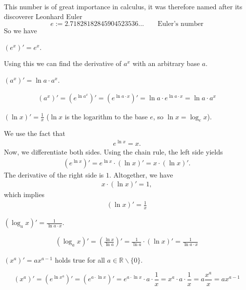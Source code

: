 \documentclass[12pt,eng]{skript_ogg}
\begin{document}
This number is of great importance in calculus, it was therefore named after its discoverer Leonhard Euler
\[e:=2.71828182845904523536\ldots\qquad\mbox{Euler's number}\]
So we have
\begin{satz}$\left( e^{x}\right)'=e^{x}$.
\end{satz}
Using this we can find the derivative of $a^x$ with an arbitrary base $a$.
\begin{satz}$(a^x)'=\ln a\cdot a^x$.
\end{satz}
\begin{beweis}
\begin{align*}
\left(a^x\right)'=\left(e^{\ln a^x}\right)'=\left(e^{\ln a\cdot x}\right)'=\ln a \cdot e^{\ln a\cdot x}=\ln a \cdot a^x
\end{align*}
\end{beweis}

\newpage

\begin{satz}
$(\ln x)'=\frac{1}{x}$ ($\ln x$ is the logarithm to the base $e$, so $\ln x=\log_ex$). 
\end{satz}
\begin{beweis}
We use the fact that
\begin{align*}
e^{\ln x}=x.
\end{align*}
Now, we differentiate both sides. Using the chain rule, the left side yields
\begin{align*}
\left(e^{\ln x} \right)'=e^{\ln x}\cdot \left(\ln x\right)'=x\cdot(\ln x)'.
\end{align*}
The derivative of the right side is $1$. Altogether, we have
\begin{align*}
x\cdot (\ln x)'=1,
\end{align*}
which implies
\begin{align*}
(\ln x)'=\frac{1}{x}
\end{align*}
\end{beweis}

\begin{satz}
$(\log_a x)'=\frac{1}{\ln a\cdot x}$.
\end{satz}

\begin{beweis}
\begin{align*}
(\log_a x)'=\left(\frac{\ln x}{\ln a}\right)'=\frac{1}{\ln a}\cdot (\ln
x)'=\frac{1}{\ln a\cdot x}
\end{align*}
\end{beweis}

\begin{satz}$(x^a)'=ax^{a-1}$ holds true for all $a\in\mathbb{R}\backslash\{0\}$.
\end{satz}
\begin{beweis}
\[(x^a)'=\left(e^{\ln x^a}\right)'=\left(e^{a\cdot\ln x}\right)'=e^{a\cdot\ln x}\cdot a\cdot\frac{1}{x}=x^a\cdot a\cdot\frac{1}{x}=a\frac{x^a}{x}=ax^{a-1}\]
\end{beweis}
\end{document}

